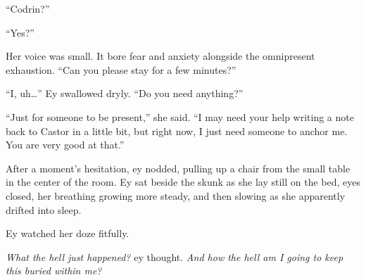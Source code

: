 ``Codrin?''

``Yes?''

Her voice was small. It bore fear and anxiety alongside the omnipresent exhaustion. ``Can you please stay for a few minutes?''

``I, uh\ldots{}'' Ey swallowed dryly. ``Do you need anything?''

``Just for someone to be present,'' she said. ``I may need your help writing a note back to Castor in a little bit, but right now, I just need someone to anchor me. You are very good at that.''

After a moment's hesitation, ey nodded, pulling up a chair from the small table in the center of the room. Ey sat beside the skunk as she lay still on the bed, eyes closed, her breathing growing more steady, and then slowing as she apparently drifted into sleep.

Ey watched her doze fitfully.

\emph{What the hell just happened?} ey thought. \emph{And how the hell am I going to keep this buried within me?}
